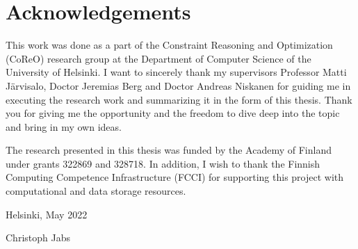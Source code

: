 \chapter*{Acknowledgements}

This work was done as a part of the Constraint Reasoning and Optimization (CoReO) research group at the Department of Computer Science of the University of Helsinki.
I want to sincerely thank my supervisors Professor Matti Järvisalo, Doctor Jeremias Berg and Doctor Andreas Niskanen for guiding me in executing the research work and summarizing it in the form of this thesis.
Thank you for giving me the opportunity and the freedom to dive deep into the topic and bring in my own ideas.

The research presented in this thesis was funded by the Academy of Finland under grants 322869 and 328718.
In addition, I wish to thank the Finnish Computing Competence Infrastructure (FCCI) for supporting this project with computational and data storage resources.

\begin{flushright}
  Helsinki, May 2022

  Christoph Jabs
\end{flushright}
